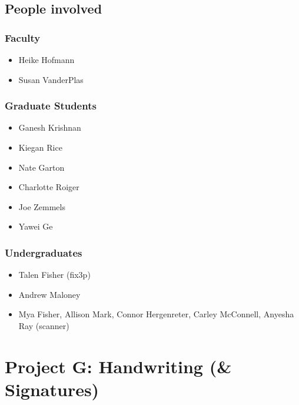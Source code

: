 \documentclass[]{book}
\providecommand{\tightlist}{%
  \setlength{\itemsep}{0pt}\setlength{\parskip}{0pt}}
\begin{document}
\hypertarget{people-involved}{%
\section{People involved}\label{people-involved}}

\hypertarget{faculty}{%
\subsection{Faculty}\label{faculty}}

\begin{itemize}
\tightlist
\item
  Heike Hofmann
\item
  Susan VanderPlas
\end{itemize}

\hypertarget{graduate-students}{%
\subsection{Graduate Students}\label{graduate-students}}

\begin{itemize}
\tightlist
\item
  Ganesh Krishnan
\item
  Kiegan Rice
\item
  Nate Garton
\item
  Charlotte Roiger
\item
  Joe Zemmels
\item
  Yawei Ge
\end{itemize}

\hypertarget{undergraduates}{%
\subsection{Undergraduates}\label{undergraduates}}

\begin{itemize}
\tightlist
\item
  Talen Fisher (fix3p)
\item
  Andrew Maloney
\item
  Mya Fisher, Allison Mark, Connor Hergenreter, Carley McConnell, Anyesha Ray (scanner)
\end{itemize}

\hypertarget{project-g-handwriting-signatures}{%
\chapter{Project G: Handwriting (\& Signatures)}\label{project-g-handwriting-signatures}}
\end{document}
